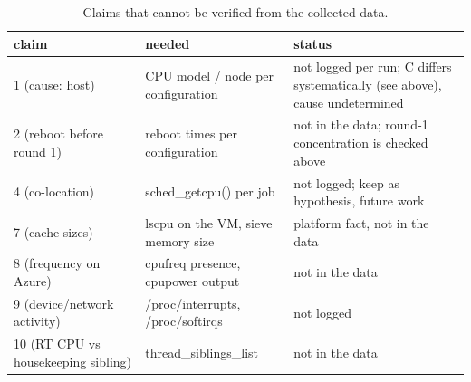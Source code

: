 \begin{table}
\caption{Claims that cannot be verified from the collected data.}
\label{tab:claims_unverifiable}
\begin{tabular}{p{4cm}p{5cm}p{5.5cm}}
\toprule
claim & needed & status \\
\midrule
1 (cause: host) & CPU model / node per configuration & not logged per run; C differs systematically (see above), cause undetermined \\
2 (reboot before round 1) & reboot times per configuration & not in the data; round-1 concentration is checked above \\
4 (co-location) & sched\_getcpu() per job & not logged; keep as hypothesis, future work \\
7 (cache sizes) & lscpu on the VM, sieve memory size & platform fact, not in the data \\
8 (frequency on Azure) & cpufreq presence, cpupower output & not in the data \\
9 (device/network activity) & /proc/interrupts, /proc/softirqs & not logged \\
10 (RT CPU vs housekeeping sibling) & thread\_siblings\_list & not in the data \\
\bottomrule
\end{tabular}
\end{table}
